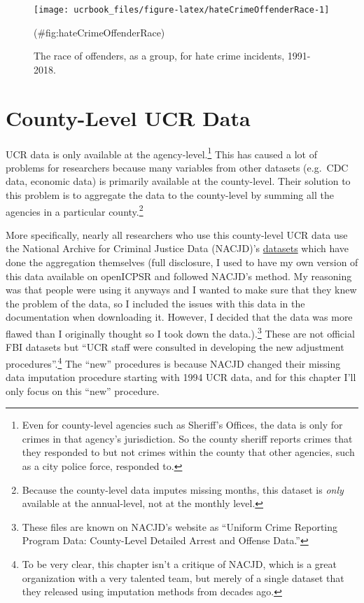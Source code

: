 \documentclass[
  12pt,
  openany]{book}
\begin{document}
\begin{figure}

{\centering \texttt{[image: ucrbook\_files/figure-latex/hateCrimeOffenderRace-1]} 

}

\caption{The race of offenders, as a group, for hate crime incidents, 1991-2018.}(\#fig:hateCrimeOffenderRace)
\end{figure}

\hypertarget{county-level-ucr-data}{%
\chapter{County-Level UCR Data}\label{county-level-ucr-data}}

UCR data is only available at the agency-level.\footnote{Even for county-level agencies such as Sheriff's Offices, the data is only for crimes in that agency's jurisdiction. So the county sheriff reports crimes that they responded to but not crimes within the county that other agencies, such as a city police force, responded to.} This has caused a lot of problems for researchers because many variables from other datasets (e.g.~CDC data, economic data) is primarily available at the county-level. Their solution to this problem is to aggregate the data to the county-level by summing all the agencies in a particular county.\footnote{Because the county-level data imputes missing months, this dataset is \emph{only} available at the annual-level, not at the monthly level.}

More specifically, nearly all researchers who use this county-level UCR data use the National Archive for Criminal Justice Data (NACJD)'s \href{https://www.icpsr.umich.edu/web/pages/NACJD/guides/ucr.html\#desc_cl}{datasets} which have done the aggregation themselves (full disclosure, I used to have my own version of this data available on openICPSR and followed NACJD's method. My reasoning was that people were using it anyways and I wanted to make sure that they knew the problem of the data, so I included the issues with this data in the documentation when downloading it. However, I decided that the data was more flawed than I originally thought so I took down the data.).\footnote{These files are known on NACJD's website as ``Uniform Crime Reporting Program Data: County-Level Detailed Arrest and Offense Data.''} These are not official FBI datasets but ``UCR staff were consulted in developing the new adjustment procedures''.\footnote{To be very clear, this chapter isn't a critique of NACJD, which is a great organization with a very talented team, but merely of a single dataset that they released using imputation methods from decades ago.} The ``new'' procedures is because NACJD changed their missing data imputation procedure starting with 1994 UCR data, and for this chapter I'll only focus on this ``new'' procedure.
\end{document}
